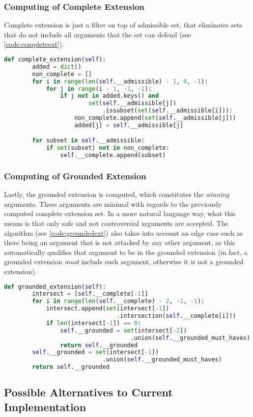         \subsubsection{Computing of Complete Extension}
            
            Complete extension is just a filter on top of admissible set, that eliminates sets that do not include all arguments that the set can defend (see \cref{code:completeext}).
        
            \begin{lstlisting}[language=Python, caption=Complete Extension, label=code:completeext]
    def complete_extension(self):
        added = dict()
        non_complete = []
        for i in range(len(self.__admissible) - 1, 0, -1):
            for j in range(i - 1, -1, -1):
                if j not in added.keys() and 
                        set(self.__admissible[j])
                            .issubset(set(self.__admissible[i])):
                    non_complete.append(set(self.__admissible[j]))
                    added[j] = self.__admissible[j]

        for subset in self.__admissible:
            if set(subset) not in non_complete:
                self.__complete.append(subset)
            \end{lstlisting}
            
        \subsubsection{Computing of Grounded Extension}
        
            Lastly, the grounded extension is computed, which constitutes the \textit{winning} arguments. These arguments are minimal with regards to the previously computed complete extension set. In a more natural language way, what this means is that only safe and not controversial arguments are accepted. The algorithm (see \cref{code:groundedext}) also takes into account an edge case such as there being an argument that is not attacked by any other argument, as this automatically qualifies that argument to be in the grounded extension (in fact, a grounded extension \textit{must} include such argument, otherwise it is not a grounded extension).
        
            \begin{lstlisting}[language=Python, caption=Grounded Extension, label=code:groundedext]
    def grounded_extension(self):
        intersect = [self.__complete[-1]]
        for i in range(len(self.__complete) - 2, -1, -1):
            intersect.append(set(intersect[-1])
                                .intersection(self.__complete[i]))
            if len(intersect[-1]) == 0:
                self.__grounded = set(intersect[-2])
                                    .union(self.__grounded_must_haves)
                return self.__grounded
        self.__grounded = set(intersect[-1])
                            .union(self.__grounded_must_haves)
        return self.__grounded
            \end{lstlisting}
            
    \subsection{Possible Alternatives to Current Implementation}
        